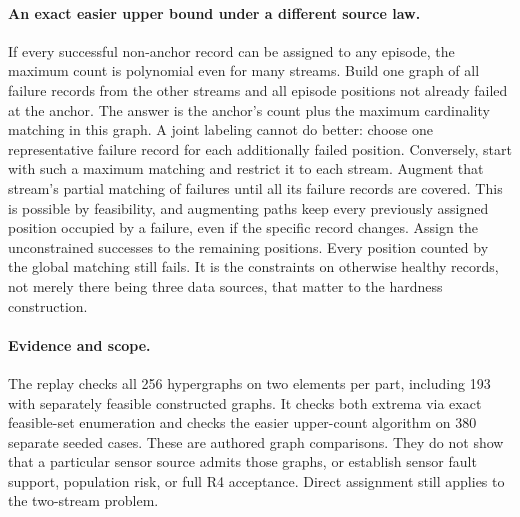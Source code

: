\documentclass[11pt]{article}
\begin{document}
\paragraph{An exact easier upper bound under a different source law.}
If every successful non-anchor record can be assigned to any
episode, the maximum count is polynomial even for many streams.
Build one graph of all failure records from the other streams
and all episode positions not already failed at the anchor.
The answer is the anchor's count plus the maximum cardinality
matching in this graph. A joint labeling cannot do better:
choose one representative failure record for each additionally
failed position. Conversely, start with such a maximum matching
and restrict it to each stream. Augment that stream's partial
matching of failures until all its failure records are covered.
This is possible by feasibility, and augmenting paths keep every
previously assigned position occupied by a failure, even if the
specific record changes. Assign the unconstrained successes to
the remaining positions. Every position counted by the global
matching still fails. It is the constraints on otherwise healthy
records, not merely there being three data sources, that matter
to the hardness construction.

\paragraph{Evidence and scope.}
The replay checks all 256 hypergraphs on two elements per part,
including 193 with separately feasible constructed graphs. It
checks both extrema via exact feasible-set enumeration and checks
the easier upper-count algorithm on 380 separate seeded cases.
These are authored graph comparisons. They do not show that a
particular sensor source admits those graphs, or establish sensor
fault support, population risk, or full R4 acceptance. Direct
assignment still applies to the two-stream problem.
\end{document}
